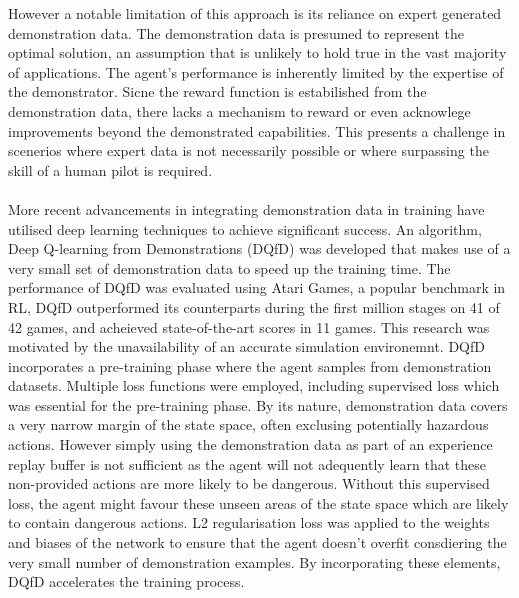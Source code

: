 However a notable limitation of this approach is its reliance on expert generated demonstration data.
The demonstration data is presumed to represent the optimal solution, an assumption that is unlikely to hold true in the vast majority of applications.
The agent's performance is inherently limited by the expertise of the demonstrator.
Sicne the reward function is estabilished from the demonstration data, there lacks a mechanism to reward or even acknowlege improvements beyond the demonstrated capabilities.
This presents a challenge in scenerios where expert data is not necessarily possible or where surpassing the skill of a human pilot is required. \\\\


More recent advancements in integrating demonstration data in training have utilised deep learning techniques to achieve significant success\cite{deepQLearningFromDemo}.
An algorithm, Deep Q-learning from Demonstrations (DQfD) was developed that makes use of a very small set of demonstration data to speed up the training time.
The performance of DQfD was evaluated using Atari Games, a popular benchmark in RL, DQfD outperformed its counterparts during the first million stages on 41 of 42 games, and acheieved state-of-the-art scores in 11 games.
This research was motivated by the unavailability of an accurate simulation environemnt.
DQfD incorporates a pre-training phase where the agent samples from demonstration datasets.
Multiple loss functions were employed, including supervised loss which was essential for the pre-training phase.
By its nature, demonstration data covers a very narrow margin of the state space, often exclusing potentially hazardous actions.
However simply using the demonstration data as part of an experience replay buffer is not sufficient as the agent will not adequently learn that these non-provided actions are more likely to be dangerous.
Without this supervised loss, the agent might favour these unseen areas of the state space which are likely to contain dangerous actions.
L2 regularisation loss was applied to the weights and biases of the network to ensure that the agent doesn't overfit consdiering the very small number of demonstration examples.
By incorporating these elements, DQfD accelerates the training process.

